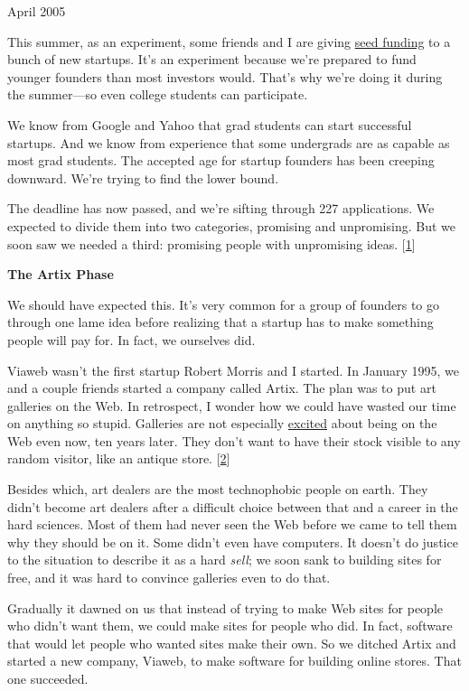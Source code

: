 April 2005

This summer, as an experiment, some friends and I are giving
\href{http://ycombinator.com}{seed funding} to a bunch of new startups.
It's an experiment because we're prepared to fund younger founders than
most investors would. That's why we're doing it during the summer---so
even college students can participate.

We know from Google and Yahoo that grad students can start successful
startups. And we know from experience that some undergrads are as
capable as most grad students. The accepted age for startup founders has
been creeping downward. We're trying to find the lower bound.

The deadline has now passed, and we're sifting through 227 applications.
We expected to divide them into two categories, promising and
unpromising. But we soon saw we needed a third: promising people with
unpromising ideas. {[}\hyperref[f1n]{1}{]}

\textbf{The Artix Phase}

We should have expected this. It's very common for a group of founders
to go through one lame idea before realizing that a startup has to make
something people will pay for. In fact, we ourselves did.

Viaweb wasn't the first startup Robert Morris and I started. In January
1995, we and a couple friends started a company called Artix. The plan
was to put art galleries on the Web. In retrospect, I wonder how we
could have wasted our time on anything so stupid. Galleries are not
especially \href{http://www.knoedlergallery.com/}{excited} about being
on the Web even now, ten years later. They don't want to have their
stock visible to any random visitor, like an antique store.
{[}\hyperref[f2n]{2}{]}

Besides which, art dealers are the most technophobic people on earth.
They didn't become art dealers after a difficult choice between that and
a career in the hard sciences. Most of them had never seen the Web
before we came to tell them why they should be on it. Some didn't even
have computers. It doesn't do justice to the situation to describe it as
a hard \emph{sell}; we soon sank to building sites for free, and it was
hard to convince galleries even to do that.

Gradually it dawned on us that instead of trying to make Web sites for
people who didn't want them, we could make sites for people who did. In
fact, software that would let people who wanted sites make their own. So
we ditched Artix and started a new company, Viaweb, to make software for
building online stores. That one succeeded.

